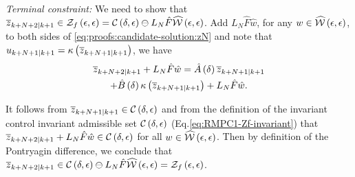 \noindent\textit{Terminal constraint:}
%
We need to show that $\overline{z}_{k+N+2| k+1}\in\mathcal{Z}_{f}\left(\epsilon,\epsilon\right)=\mathcal{C}\left(\delta,\epsilon\right)\ominus L_{N}\hat{F}\widehat{\mathcal{W}}\left(\epsilon,\epsilon\right)$.
Add $L_{N}\hat{F}\hat{w}$, for any $w\in\widehat{\mathcal{W}}\left(\epsilon,\epsilon\right)$,
to both sides of \eqref{eq:proofs:candidate-solution:zN} and note that
$u_{k+N+1| k+1}=\kappa\left(\overline{z}_{k+N+1| k+1}\right)$,
we have 
\begin{multline*}
  \overline{z}_{k+N+2|
    k+1}+L_{N}\hat{F}\hat{w}=\hat{A}\left(\delta\right)\overline{z}_{k+N+1| k+1} \\
  +\hat{B}\left(\delta\right)\kappa\left(\overline{z}_{k+N+1| k+1}\right)+L_{N}\hat{F}\hat{w}\text{.}
\end{multline*}


 It follows from $\overline{z}_{k+N+1| k+1}\in\mathcal{C}\left(\delta,\epsilon\right)$
and from the definition of the invariant control invariant admissible
set $\mathcal{C}\left(\delta,\epsilon\right)$ (Eq.\eqref{eq:RMPC1-Zf-invariant})
that $\overline{z}_{k+N+2| k+1}+L_{N}\hat{F}\hat{w}\in\mathcal{C}\left(\delta,\epsilon\right)$
for all $w\in\widehat{\mathcal{W}}\left(\epsilon,\epsilon\right)$. Then by definition
of the Pontryagin difference, we conclude that $\overline{z}_{k+N+2| k+1}\in\mathcal{C}\left(\delta,\epsilon\right)\ominus L_{N}\hat{F}\widehat{\mathcal{W}}\left(\epsilon,\epsilon\right)=\mathcal{Z}_{f}\left(\epsilon,\epsilon\right)$.



